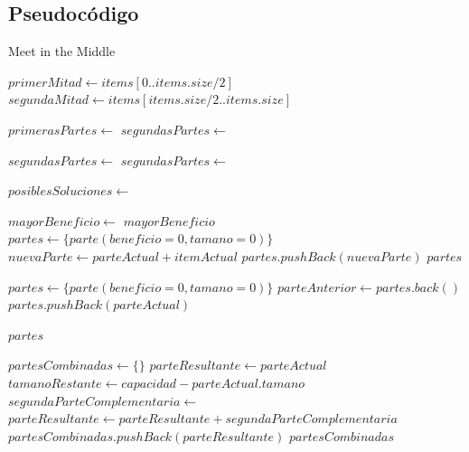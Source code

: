 \documentclass[10pt, a4paper]{article}
\begin{document}
\subsection{Pseudocódigo}
\begin{algorithm}
\caption{Meet in the Middle}
\begin{algorithmic}[1]
	\State $primerMitad \gets items[0..items.size / 2]$
	\State $segundaMitad \gets items[items.size / 2..items.size]$

	\State $primerasPartes \gets $ 
	\State $segundasPartes \gets $ 

	\State $segundasPartes \gets $ 
	\State $segundasPartes \gets $ 

	\State $posiblesSoluciones \gets $ 

	\State $mayorBeneficio \gets $ 
	\State \Return $mayorBeneficio$
\EndFunction
\\
	\State $partes \gets \{parte(beneficio=0, tamano=0)\}$
			\State $nuevaParte \gets parteActual + itemActual$
				\State $partes.pushBack(nuevaParte)$
			\EndIf
		\EndFor
	\EndFor
	\State \Return $partes$
\EndFunction
\\

	\State $partes \gets \{parte(beneficio=0, tamano=0)\}$
		\State $parteAnterior \gets partes.back()$
			\State $partes.pushBack(parteActual)$
		\EndIf
	\EndFor

	\State \Return $partes$
\EndFunction
{}
\end{algorithmic}
\end{algorithm}

\begin{algorithm}
\begin{algorithmic}[1]

	\State $partesCombinadas \gets \{\}$
		\State $parteResultante \gets parteActual$
		\State $tamanoRestante \gets capacidad - parteActual.tamano$
		\State $segundaParteComplementaria \gets$
			\State $parteResultante \gets parteResultante + segundaParteComplementaria$
		\EndIf
		\State $partesCombinadas.pushBack(parteResultante)$
	\EndFor
	\State \Return $partesCombinadas$
\EndFunction
\end{algorithmic}
\end{algorithm}
\pagebreak
\end{document}
